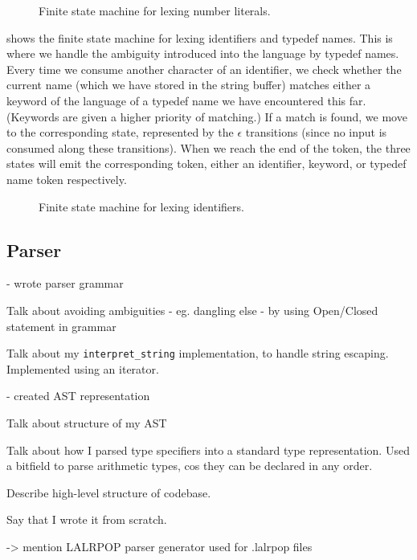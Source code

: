\documentclass[00-main.tex]{subfiles}
\begin{document}
\begin{figure}[ht]
  \centering
  \caption{Finite state machine for lexing number literals.}
  \label{fig:lexing numbers fsm}
\end{figure}

 shows the finite state machine for lexing identifiers and typedef names.
This is where we handle the ambiguity introduced into the language by typedef names.
  Every time we consume another character of an identifier, we check whether the current name (which we have stored in the string buffer) matches either a keyword of the language of a typedef name we have encountered this far.
(Keywords are given a higher priority of matching.)
  If a match is found, we move to the corresponding state, represented by the $\epsilon$ transitions (since no input is consumed along these transitions).
When we reach the end of the token, the three states will emit the corresponding token, either an identifier, keyword, or typedef name token respectively.

\begin{figure}[ht]
  \centering
  \caption{Finite state machine for lexing identifiers.}
  \label{fig:lexing identifiers fsm}
\end{figure}


\subsection{Parser}

\begin{Comment}
- wrote parser grammar

Talk about avoiding ambiguities - eg. dangling else - by using Open/Closed statement in grammar

Talk about my \texttt{interpret\_string} implementation, to handle string escaping. Implemented using an iterator.

- created AST representation

Talk about structure of my AST

Talk about how I parsed type specifiers into a standard type representation. Used a bitfield to parse arithmetic types, cos they can be declared in any order.
\end{Comment}

\begin{Comment}
Describe high-level structure of codebase.

Say that I wrote it from scratch.

-> mention LALRPOP parser generator used for .lalrpop files
\end{Comment}
\end{document}
